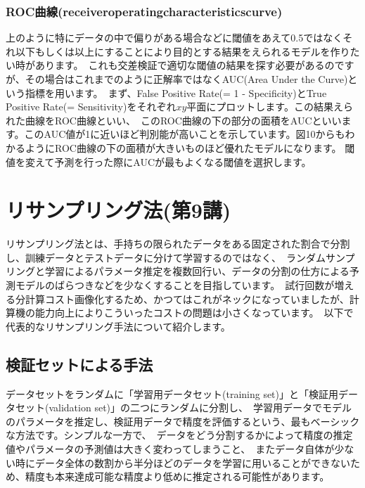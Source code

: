 \documentclass[uplatex]{jsarticle}
\begin{document}
\subsubsection{ROC曲線(receiveroperatingcharacteristicscurve)}
上のように特にデータの中で偏りがある場合などに閾値をあえて0.5ではなくそれ以下もしくは以上にすることにより目的とする結果をえられるモデルを作りたい時があります。\
これも交差検証で適切な閾値の結果を探す必要があるのですが、その場合はこれまでのように正解率ではなくAUC(Area Under the Curve)という指標を用います。\
まず、False Positive Rate(= 1 - Specificity)とTrue Positive Rate(= Sensitivity)をそれぞれ$xy$平面にプロットします。この結果えられた曲線をROC曲線といい、\
このROC曲線の下の部分の面積をAUCといいます。このAUC値が1に近いほど判別能が高いことを示しています。図10からもわかるようにROC曲線の下の面積が大きいものほど優れたモデルになります。
閾値を変えて予測を行った際にAUCが最もよくなる閾値を選択します。

\section{リサンプリング法(第9講)}
リサンプリング法とは、手持ちの限られたデータをある固定された割合で分割し、訓練データとテストデータに分けて学習するのではなく、\
ランダムサンプリングと学習によるパラメータ推定を複数回行い、データの分割の仕方による予測モデルのばらつきなどを少なくすることを目指しています。\
試行回数が増える分計算コスト画像化するため、かつてはこれがネックになっていましたが、計算機の能力向上によりこういったコストの問題は小さくなっています。\
以下で代表的なリサンプリング手法について紹介します。
\subsection{検証セットによる手法}
データセットをランダムに「学習用データセット(training set)」と「検証用データセット(validation set)」の二つにランダムに分割し、\
学習用データでモデルのパラメータを推定し、検証用データで精度を評価するという、最もベーシックな方法です。シンプルな一方で、\
データをどう分割するかによって精度の推定値やパラメータの予測値は大きく変わってしまうこと、\
またデータ自体が少ない時にデータ全体の数割から半分ほどのデータを学習に用いることができないため、精度も本来達成可能な精度より低めに推定される可能性があります。
\end{document}

